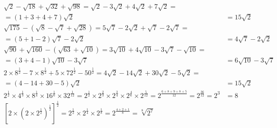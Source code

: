 \documentclass[a4paper,12pt]{article}
\begin{document}
\subsection{} %

\begin{align*}
\sqrt{2} - \sqrt{18} + \sqrt{32} + \sqrt{98}
= \sqrt{2} - 3\sqrt{2} + 4\sqrt{2} + 7\sqrt{2} = \\[6pt]
= (1 + 3 + 4 + 7)\sqrt{2}
&= 15\sqrt{2} \\[6pt] %
\sqrt{175} - (\sqrt{8} - \sqrt{7} + \sqrt{28})
= 5\sqrt{7} - 2\sqrt{2} + \sqrt{7} - 2\sqrt{7} = \\[6pt]
= (5 + 1 - 2)\sqrt{7} - 2\sqrt{2}
&= 4\sqrt{7} - 2\sqrt{2} \\[6pt]
\sqrt{90} + \sqrt{160} - (\sqrt{63} + \sqrt{10})
= 3\sqrt{10} + 4\sqrt{10} - 3\sqrt{7} - \sqrt{10} = \\[6pt]
= (3 + 4 - 1)\sqrt{10} - 3\sqrt{7}
&= 6\sqrt{10} - 3\sqrt{7} \\[6pt]
2 \times 8^{\frac{1}{2}} - 7 \times 8^{\frac{1}{2}} + 5 \times 72^{\frac{1}{2}} - 50^{\frac{1}{2}}
= 4\sqrt{2} - 14\sqrt{2} + 30\sqrt{2} - 5\sqrt{2} = \\[6pt]
= (4 - 14 + 30 - 5)\sqrt{2}
&= 15\sqrt{2} \\[6pt]
2^{\frac{1}{2}} \times 4^{\frac{1}{3}} \times 8^{\frac{1}{4}} \times 16^{\frac{1}{6}} \times 32^{\frac{1}{12}}
= 2^{\frac{1}{2}} \times 2^{\frac{2}{3}} \times 2^{\frac{3}{4}} \times 2^{\frac{4}{6}} \times 2^{\frac{5}{12}}
= 2^{\frac{6 + 8 + 9 + 8 + 5}{12}}
= 2^{\frac{36}{12}}
= 2^{3}
&= 8 \\[6pt]
[2 \times (2 \times 2^{\frac{1}{2}})^{\frac{1}{2}}]^{\frac{1}{2}}
= 2^{\frac{1}{2}} \times 2^{\frac{1}{4}} \times 2^{\frac{1}{8}}
= 2^{\frac{4 + 2 + 1}{8}}
= \sqrt[8]{2^7}
\end{align*}
\end{document}
